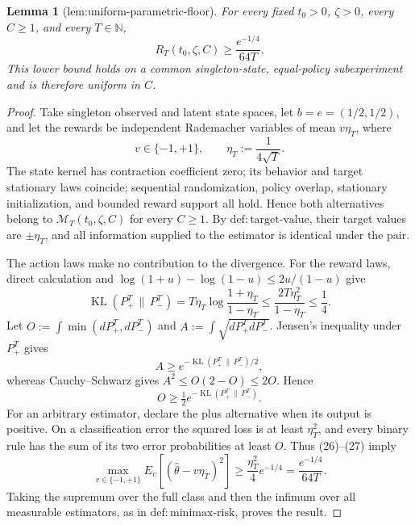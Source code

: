\documentclass{article}
\newtheorem{lemma}{Lemma}
\begin{document}
\begin{lemma}[lem:uniform-parametric-floor]\label{lem:uniform-parametric-floor}
For every fixed \(t_0>0\), \(\zeta>0\), every \(C\ge1\), and every \(T\in\mathbb N\),
\[
 R_T(t_0,\zeta,C)\ge\frac{e^{-1/4}}{64T}.
\]
This lower bound holds on a common singleton-state, equal-policy subexperiment and is therefore uniform in \(C\).
\end{lemma}
\begin{proof}
Take singleton observed and latent state spaces, let \(b=e=(1/2,1/2)\), and let the rewards be independent Rademacher variables of mean \(v\eta_T\), where
\[
 v\in\{-1,+1\},
 \qquad
 \eta_T:=\frac1{4\sqrt T}.
\]
The state kernel has contraction coefficient zero; its behavior and target stationary laws coincide; sequential randomization, policy overlap, stationary initialization, and bounded reward support all hold.  Hence both alternatives belong to \(\mathcal M_T(t_0,\zeta,C)\) for every \(C\ge1\).  By \(\mathrm{def{:}target\text{-}value}\), their target values are \(\pm\eta_T\), and all information supplied to the estimator is identical under the pair.

The action laws make no contribution to the divergence.  For the reward laws, direct calculation and \(\log(1+u)-\log(1-u)\le2u/(1-u)\) give
\[
 \operatorname{KL}(P_+^T\,\|\,P_-^T)
 =T\eta_T\log\frac{1+\eta_T}{1-\eta_T}
 \le\frac{2T\eta_T^2}{1-\eta_T}\le\frac14. \tag{26}
\]
Let \(O:=\int\min(dP_+^T,dP_-^T)\) and \(A:=\int\sqrt{dP_+^TdP_-^T}\).  Jensen's inequality under \(P_+^T\) gives
\[
 A\ge e^{-\operatorname{KL}(P_+^T\,\|\,P_-^T)/2},
\]
whereas Cauchy--Schwarz gives \(A^2\le O(2-O)\le2O\).  Hence
\[
 O\ge\tfrac12e^{-\operatorname{KL}(P_+^T\,\|\,P_-^T)}. \tag{27}
\]
For an arbitrary estimator, declare the plus alternative when its output is positive.  On a classification error the squared loss is at least \(\eta_T^2\), and every binary rule has the sum of its two error probabilities at least \(O\).  Thus (26)--(27) imply
\[
 \max_{v\in\{-1,+1\}}E_v[(\widehat\theta-v\eta_T)^2]
 \ge\frac{\eta_T^2}{4}e^{-1/4}
 =\frac{e^{-1/4}}{64T}.
\]
Taking the supremum over the full class and then the infimum over all measurable estimators, as in \(\mathrm{def{:}minimax\text{-}risk}\), proves the result.
\end{proof}
\end{document}
